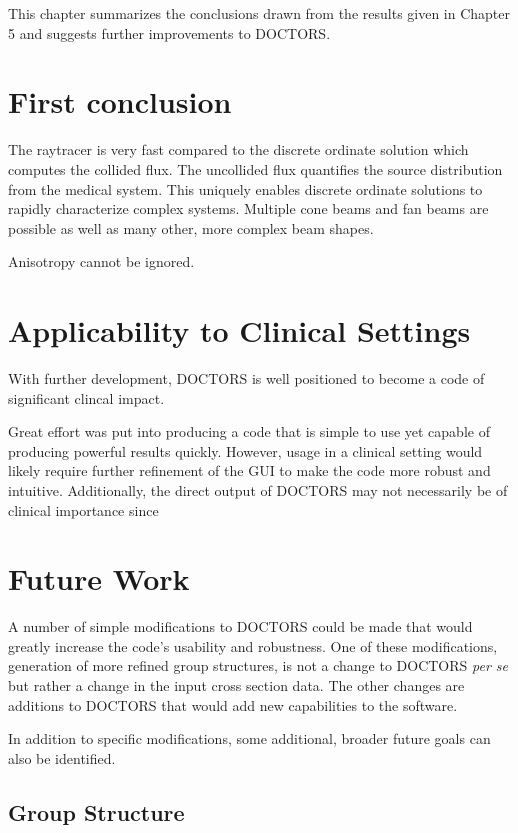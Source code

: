 
This chapter summarizes the conclusions drawn from the results given in Chapter 5 and suggests further improvements to DOCTORS.

\section{First conclusion}

The raytracer is very fast compared to the discrete ordinate solution which computes the collided flux. The uncollided flux quantifies the source distribution from the medical system. This uniquely enables discrete ordinate solutions to rapidly characterize complex systems. Multiple cone beams and fan beams are possible as well as many other, more complex beam shapes.

Anisotropy cannot be ignored.

\section{Applicability to Clinical Settings}
With further development, DOCTORS is well positioned to become a code of significant clincal impact.

Great effort was put into producing a code that is simple to use yet capable of producing powerful results quickly. However, usage in a clinical setting would likely require further refinement of the GUI to make the code more robust and intuitive. Additionally, the direct output of DOCTORS may not necessarily be of clinical importance since 

\section{Future Work}

A number of simple modifications to DOCTORS could be made that would greatly increase the code's usability and robustness. One of these modifications, generation of more refined group structures, is not a change to DOCTORS \textit{per se} but rather a change in the input cross section data. The other changes are additions to DOCTORS that would add new capabilities to the software.

In addition to specific modifications, some additional, broader future goals can also be identified.

\subsection{Group Structure}

